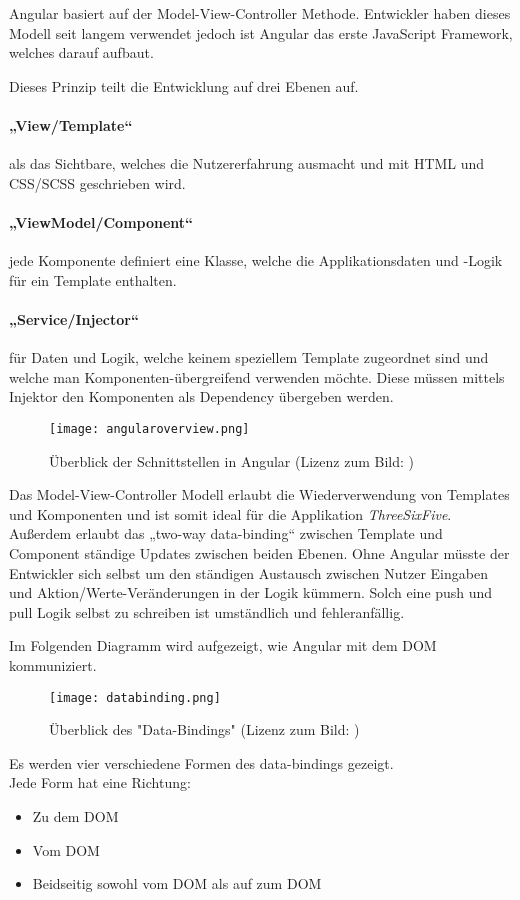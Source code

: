 Angular basiert auf der Model-View-Controller Methode. Entwickler haben dieses Modell seit langem verwendet jedoch ist Angular das erste JavaScript Framework, welches darauf aufbaut.

Dieses Prinzip teilt die Entwicklung auf drei Ebenen auf.

\paragraph{„View/Template“} als das Sichtbare, welches die Nutzererfahrung ausmacht und mit HTML und CSS/SCSS geschrieben wird.

\paragraph{„ViewModel/Component“} jede Komponente definiert eine Klasse, welche die Applikationsdaten und -Logik für ein Template enthalten.

\paragraph{„Service/Injector“} für Daten und Logik, welche keinem speziellem Template zugeordnet sind und welche man Komponenten-übergreifend verwenden möchte. Diese müssen mittels Injektor den Komponenten als Dependency übergeben werden.
\\

\begin{figure}[H] \centering \texttt{[image: angularoverview.png]} \caption{Überblick der Schnittstellen in Angular (Lizenz zum Bild: \cite{SchnittstellenBild})} \end{figure}

Das Model-View-Controller Modell erlaubt die Wiederverwendung von Templates und Komponenten und ist somit ideal für die Applikation \textit{ThreeSixFive}. Außerdem erlaubt das „two-way data-binding“ zwischen Template und Component ständige Updates zwischen beiden Ebenen. Ohne Angular müsste der Entwickler sich selbst um den ständigen Austausch zwischen Nutzer Eingaben und Aktion/Werte-Veränderungen in der Logik kümmern. Solch eine push und pull Logik selbst zu schreiben ist umständlich und fehleranfällig.

Im Folgenden Diagramm wird aufgezeigt, wie Angular mit dem DOM kommuniziert.

\begin{figure}[H] \centering \texttt{[image: databinding.png]} \caption{Überblick des "Data-Bindings" (Lizenz zum Bild: \cite{DatabindingBild})} \end{figure}
Es werden vier verschiedene Formen des data-bindings gezeigt.\\
 Jede Form hat eine Richtung:\\
\begin{itemize}
\item Zu dem DOM
\item Vom DOM
\item Beidseitig sowohl vom DOM als auf zum DOM
\end{itemize}

